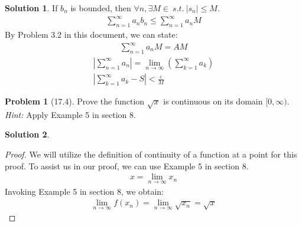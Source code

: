 \documentclass[12pt]{article}
\theoremstyle{definition} %
\newtheorem{solution}{Solution}
\newtheorem{problem}{Problem}
\theoremstyle{plain} %
\begin{document}
\begin{solution}
   If \(b_{n}\) is bounded, then \(\forall n, \exists M\in \ s.t. \ \left\vert s_{n} \right\vert\leq M \). 
   \begin{align}
      \sum_{n=1}^{\infty} a_{n}b_{n} \leq \sum_{n=1}^{\infty} a_{n}M
   \end{align}
   By Problem 3.2 in this document, we can state:
   \begin{align}
      \sum_{n=1}^{\infty} a_{n}M=AM
   \end{align}
   \begin{align}
      \left\vert \sum_{n=1}^{\infty} a_{n} \right\vert = \lim_{n \to \infty} \left( \sum_{k=1}^{\infty} a_{k} \right) \\[10pt] 
      \left\vert \sum_{k=1}^{\infty} a_{k}-S \right\vert <\frac{\varepsilon}{M}
   \end{align}

\end{solution}

\begin{problem}[17.4]
   Prove the function \(\sqrt{x} \) is continuous on its domain \([0,\infty )\). \emph{Hint:} Apply Example 5 in section 8. 
\end{problem}
\begin{solution}
   \begin{proof}
      We will utilize the definition of continuity of a function at a point for this proof. To assist us in our proof, we can use Example 5 in section 8.
      \begin{align}   
      x=\lim_{n \to \infty} x_{n}
      \end{align}
      Invoking Example 5 in section 8, we obtain: 
      \begin{align}   
      \lim_{n \to \infty} f(x_{n}) = \lim_{n \to \infty} \sqrt{x_{n}} = \sqrt{x}  
      \end{align}
   \end{proof} 
\end{solution}
\end{document}
